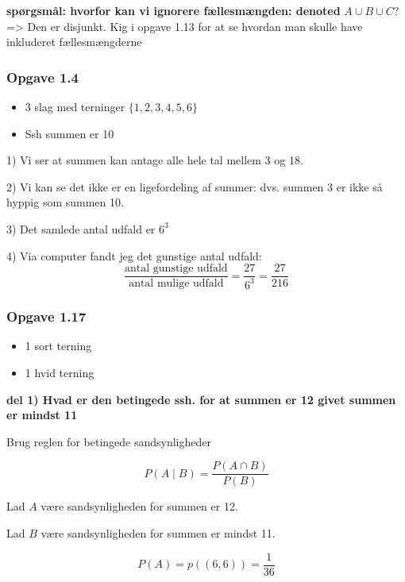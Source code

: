 \textbf{spørgsmål: hvorfor kan vi ignorere fællesmængden: denoted} $A \cup B \cup C$? => Den er disjunkt. Kig i opgave 1.13 for at se hvordan man skulle have inkluderet fællesmængderne

\subsubsection{Opgave 1.4}

\begin{itemize}
    \item 3 slag med terninger  $\{1, 2, 3, 4, 5, 6 \}$
    \item Ssh summen er 10
\end{itemize}

1) Vi ser at summen kan antage alle hele tal mellem 3 og 18. 

2) Vi kan se det ikke er en ligefordeling af summer: dvs. summen 3 er ikke så hyppig som summen 10. 

3) Det samlede antal udfald er $6^3$

4) Via computer fandt jeg det gunstige antal udfald: 
\begin{equation}
    \frac{\text{antal gunstige udfald}}{\text{antal mulige udfald}}=\frac{27}{6^3}=\frac{27}{216}
\end{equation}


\subsubsection{Opgave 1.17}

\begin{itemize}
    \item 1 sort terning
    \item 1 hvid terning
\end{itemize}

\textbf{del 1) Hvad er den betingede ssh. for at summen er 12 givet summen er mindst 11}

Brug reglen for betingede sandsynligheder

\begin{equation}
    P(A\mid B) = \frac{P (A \cap B)}{P(B)}
\end{equation}

Lad $A$ være sandsynligheden for summen er 12.

Lad $B$ være sandsynligheden for summen er mindst 11.

\begin{equation}
    P(A) = p((6,6)) = \frac{1}{36}
\end{equation}

